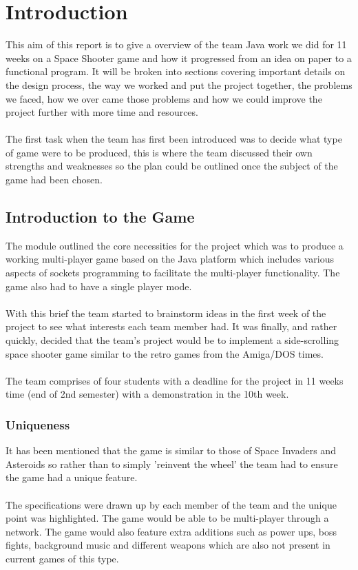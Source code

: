 
\chapter{Introduction}
\label{cha:introduction}

This aim of this report is to give a overview of the team Java work we did for 11 weeks on a Space Shooter game and how it progressed from an idea on paper to a functional program.
It will be broken into sections covering important details on the design process, the way we worked and put the project together, the problems we faced, how we over came those problems and how we could improve the project further with more time and resources.\\\\
The first task when the team has first been introduced was to decide what type of game were to be produced, this is where the team discussed their own strengths and weaknesses so the plan could be outlined once the subject of the game had been chosen.

\section{Introduction to the Game}
\label{sec: intro_to_game}
The module outlined the core necessities for the project which was to produce a working multi-player game based on the Java platform which includes various aspects of sockets programming to facilitate the multi-player functionality. The game also had to have a single player mode.\\\\
With this brief the team started to brainstorm ideas in the first week of the project to see what interests each team member had. It was finally, and rather quickly, decided that the team's project would be to implement a side-scrolling space shooter game similar to the retro games from the Amiga/DOS times.\\\\
The team comprises of four students with a deadline for the project in 11 weeks time (end of 2nd semester) with a demonstration in the 10th week.
\subsection{Uniqueness}It has been mentioned that the game is similar to those of Space Invaders and Asteroids so rather than to simply 'reinvent the wheel' the team had to ensure the game had a unique feature.\\\\
The specifications were drawn up by each member of the team and the unique point was highlighted. The game would be able to be multi-player through a network. The game would also feature extra additions such as power ups, boss fights, background music and different weapons which are also not present in current games of this type.
